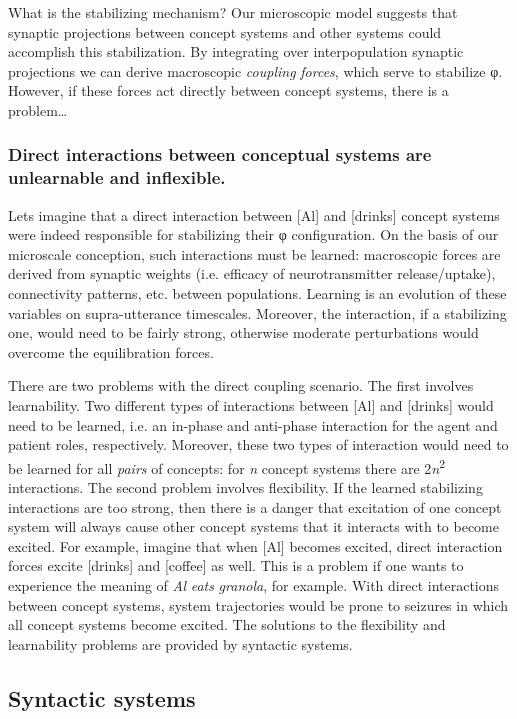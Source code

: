   What is the stabilizing mechanism? Our microscopic model suggests that synaptic projections between concept systems and other systems could accomplish this stabilization. By integrating over interpopulation synaptic projections we can derive macroscopic \textit{coupling} \textit{forces}, which serve to stabilize φ. However, if these forces act directly between concept systems, there is a problem…

\subsubsection{Direct interactions between conceptual systems are unlearnable and inflexible.} 

Lets imagine that a direct interaction between [Al] and [drinks] concept systems were indeed responsible for stabilizing their φ configuration. On the basis of our microscale conception, such interactions must be learned: macroscopic forces are derived from synaptic weights (i.e. efficacy of neurotransmitter release/uptake), connectivity patterns, etc. between populations. Learning is an evolution of these variables on supra-utterance timescales. Moreover, the interaction, if a stabilizing one, would need to be fairly strong, otherwise moderate perturbations would overcome the equilibration forces. 

  There are two problems with the direct coupling scenario. The first involves learnability. Two different types of interactions between [Al] and [drinks] would need to be learned, i.e. an in-phase and anti-phase interaction for the agent and patient roles, respectively. Moreover, these two types of interaction would need to be learned for all \textit{pairs} of concepts: for \textit{n} concept systems there are 2\textit{n}\textsuperscript{2} interactions. The second problem involves flexibility. If the learned stabilizing interactions are too strong, then there is a danger that excitation of one concept system will always cause other concept systems that it interacts with to become excited. For example, imagine that when [Al] becomes excited, direct interaction forces excite [drinks] and [coffee] as well. This is a problem if one wants to experience the meaning of \textit{Al} \textit{eats} \textit{granola}, for example. With direct interactions between concept systems, system trajectories would be prone to seizures in which all concept systems become excited. The solutions to the flexibility and learnability problems are provided by syntactic systems.

\subsection{Syntactic systems}

